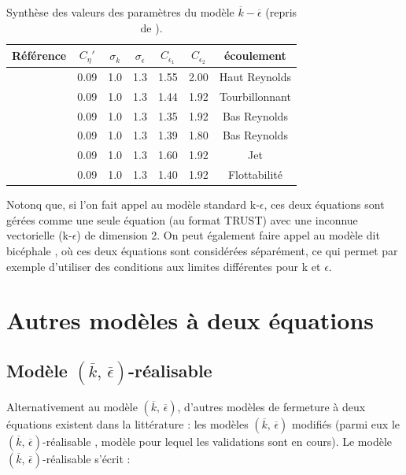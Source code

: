 \begin{table}
\begin{centering}
\begin{tabular}{ccccccc}
\hline 
R\'ef\'erence & $C_{\eta}'$ & $\sigma_{k}$ & $\sigma_{\epsilon}$ & $C_{\epsilon_{1}}$ & $C_{\epsilon_{2}}$ & \'ecoulement\tabularnewline
\hline 
\cite{Jones-Launder_IJHMT1972} & 0.09 & 1.0 & 1.3 & 1.55 & 2.00 & Haut Reynolds\tabularnewline
\cite{Launder-Sharma_LettHMT1974} & 0.09 & 1.0 & 1.3 & 1.44 & 1.92 & Tourbillonnant\tabularnewline
\cite{Chien_AIAA1982} & 0.09 & 1.0 & 1.3 & 1.35 & 1.92 & Bas Reynolds\tabularnewline
\cite{Fan_etal_AIAA1993} & 0.09 & 1.0 & 1.3 & 1.39 & 1.80 & Bas Reynolds\tabularnewline
\cite{Morgans-etal_Conf1999} & 0.09 & 1.0 & 1.3 & 1.60 & 1.92 & Jet\tabularnewline
\cite{Bahari-Hejazi_IJPMS2009} & 0.09 & 1.0 & 1.3 & 1.40 & 1.92 & Flottabilit\'e\tabularnewline
\hline 
\end{tabular}
\par\end{centering}

\protect\caption{\label{tab:Synthese-valeurs_Coeffkeps}Synth\`ese des valeurs des param\`etres
du mod\`ele $\overline{k}-\overline{\epsilon}$ (repris de \cite{Genty_RapportCEA_2019}).}
\end{table}

\bigskip

Notonq que, si l'on fait appel au mod\`ele standard k-$\epsilon$, ces deux \'equations sont g\'er\'ees comme une seule \'equation (au format TRUST) avec une inconnue vectorielle (k-$\epsilon$) de dimension 2. On peut \'egalement faire appel au mod\`ele dit \og bic\'ephale \fg, où ces deux \'equations sont consid\'er\'ees s\'epar\'ement, ce qui permet par exemple d'utiliser des conditions aux limites diff\'erentes pour k et $\epsilon$.



\section{Autres mod\`eles \`a deux \'equations}


\subsection*{Mod\`ele $(\overline{k},\,\overline{\epsilon})$-\og r\'ealisable \fg{}}

Alternativement au mod\`ele $(\overline{k},\,\overline{\epsilon})$,
d'autres mod\`eles de fermeture \`a deux \'equations existent dans la litt\'erature
: les mod\`eles $(\overline{k},\,\overline{\epsilon})$ modifi\'es (parmi
eux le $(\overline{k},\,\overline{\epsilon})$-\og r\'ealisable \fg{}
, mod\`ele pour lequel les validations sont en cours). Le mod\`ele $(\overline{k},\,\overline{\epsilon})$-\og r\'ealisable \fg{}
s'\'ecrit \cite[Eq. (22) et (23) p. 233]{Shi_etal_keps-realisable_CF1995}
:

